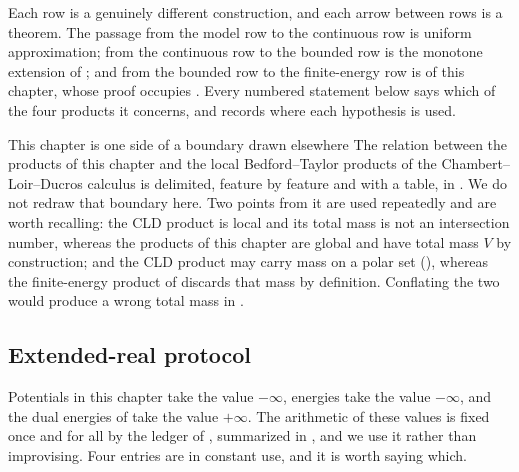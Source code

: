 Each row is a genuinely different construction, and each arrow between rows is
a theorem.  The passage from the model row to the continuous row is uniform
approximation; from the continuous row to the bounded row is the monotone
extension of ; and from the bounded row to the
finite-energy row is  of this chapter, whose proof
occupies .  Every numbered statement below says
which of the four products it concerns, and  records
where each hypothesis is used.

\begin{warning}{This chapter is one side of a boundary drawn elsewhere}
The relation between the products of this chapter and the local
Bedford--Taylor products of the Chambert--Loir--Ducros calculus is delimited,
feature by feature and with a table, in
.  We do not redraw
that boundary here.  Two points from it are used repeatedly and are worth
recalling: the CLD product is local and its total mass is not an intersection
number, whereas the products of this chapter are global and have total mass
\(V\) by construction; and the CLD product may carry mass on a polar set
(), whereas the finite-energy product of
 discards that mass by definition.  Conflating the
two would produce a wrong total mass in .
\end{warning}

\subsection{Extended-real protocol}
\label{sec:ch26-extended-real}

Potentials in this chapter take the value \(-\infty\), energies take the value
\(-\infty\), and the dual energies of
 take the value \(+\infty\).  The
arithmetic of these values is fixed once and for all by the ledger of
, summarized in
, and we use it rather than improvising.  Four
entries are in constant use, and it is worth saying which.

